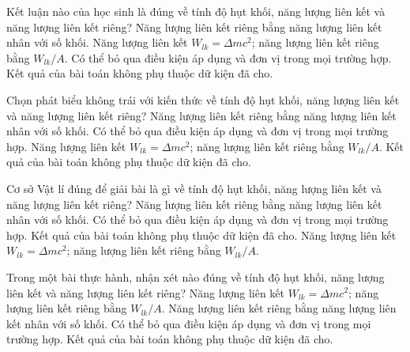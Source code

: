 \begin{ex}
Kết luận nào của học sinh là đúng về tính độ hụt khối, năng lượng liên kết và năng lượng liên kết riêng?
\choice
{Năng lượng liên kết riêng bằng năng lượng liên kết nhân với số khối.}
{\True Năng lượng liên kết $W_{lk}=\Delta m c^2$; năng lượng liên kết riêng bằng $W_{lk}/A$.}
{Có thể bỏ qua điều kiện áp dụng và đơn vị trong mọi trường hợp.}
{Kết quả của bài toán không phụ thuộc dữ kiện đã cho.}
\end{ex}

\begin{ex}
Chọn phát biểu không trái với kiến thức về tính độ hụt khối, năng lượng liên kết và năng lượng liên kết riêng?
\choice
{Năng lượng liên kết riêng bằng năng lượng liên kết nhân với số khối.}
{Có thể bỏ qua điều kiện áp dụng và đơn vị trong mọi trường hợp.}
{\True Năng lượng liên kết $W_{lk}=\Delta m c^2$; năng lượng liên kết riêng bằng $W_{lk}/A$.}
{Kết quả của bài toán không phụ thuộc dữ kiện đã cho.}
\end{ex}

\begin{ex}
Cơ sở Vật lí đúng để giải bài là gì về tính độ hụt khối, năng lượng liên kết và năng lượng liên kết riêng?
\choice
{Năng lượng liên kết riêng bằng năng lượng liên kết nhân với số khối.}
{Có thể bỏ qua điều kiện áp dụng và đơn vị trong mọi trường hợp.}
{Kết quả của bài toán không phụ thuộc dữ kiện đã cho.}
{\True Năng lượng liên kết $W_{lk}=\Delta m c^2$; năng lượng liên kết riêng bằng $W_{lk}/A$.}
\end{ex}

\begin{ex}
Trong một bài thực hành, nhận xét nào đúng về tính độ hụt khối, năng lượng liên kết và năng lượng liên kết riêng?
\choice
{\True Năng lượng liên kết $W_{lk}=\Delta m c^2$; năng lượng liên kết riêng bằng $W_{lk}/A$.}
{Năng lượng liên kết riêng bằng năng lượng liên kết nhân với số khối.}
{Có thể bỏ qua điều kiện áp dụng và đơn vị trong mọi trường hợp.}
{Kết quả của bài toán không phụ thuộc dữ kiện đã cho.}
\end{ex}

